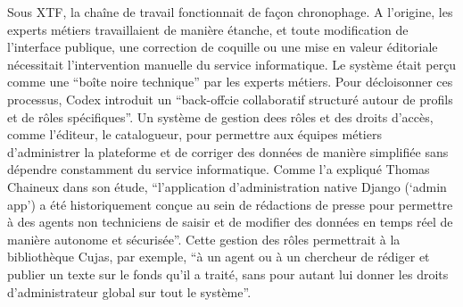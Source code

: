 Sous XTF, la chaîne de travail fonctionnait de façon chronophage. A l'origine, les experts métiers travaillaient de manière étanche, et toute modification de l'interface publique, une correction de coquille ou une mise en valeur éditoriale nécessitait l'intervention manuelle du service informatique. Le système était perçu comme une \enquote{boîte noire technique} par les experts métiers. Pour décloisonner ces processus, Codex introduit un \enquote{back-offcie collaboratif structuré autour de profils et de rôles spécifiques}. Un système de gestion dees rôles et des droits d'accès, comme l'éditeur, le catalogueur, pour permettre aux équipes métiers d'administrer la plateforme et de corriger des données de manière simplifiée sans dépendre constamment du service informatique. Comme l'a expliqué Thomas Chaineux dans son étude, \enquote{l'application d'administration native Django (\enquote{admin app}) a été historiquement conçue au sein de rédactions de presse pour permettre à des agents non techniciens de saisir et de modifier des données en temps réel de manière autonome et sécurisée}. Cette gestion des rôles permettrait à la bibliothèque Cujas, par exemple, \enquote{à un agent ou à un chercheur de rédiger et publier un texte sur le fonds qu'il a traité, sans pour autant lui donner les droits d'administrateur global sur tout le système}.    
